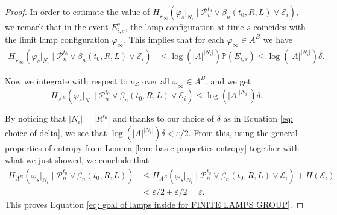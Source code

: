 \documentclass[reqno,oneside,11pt]{amsart}
\renewcommand{\P}{\mathbb{P}}
\theoremstyle{plain}
\theoremstyle{definition}
\begin{document}
\begin{proof}
In order to estimate the value of $H_{\varphi_{\infty}}\left( \varphi_{s}|_{N_i} \mid \mathcal{P}_n^{t_0}\vee\beta_n(t_0,R,L)\vee \mathcal{E}_i \right)$, we remark that in the event $E_{i,s}^c$, the lamp configuration at time $s$ coincides with the limit lamp configuration $\varphi_{\infty}$. This implies that for each $\varphi_{\infty}\in A^B$ we have
		\begin{align*}
				H_{\varphi_{\infty}}\left( \varphi_{s}|_{N_i} \mid \mathcal{P}_n^{t_0}\vee\beta_n(t_0,R,L)\vee \mathcal{E}_i \right)&\le \log\left(|A|^{|N_i|}\right)\P(E_{i,s}) \le \log\left(|A|^{|N_i|}\right)\delta.
		\end{align*}
		
	
	Now we integrate with respect to $\nu_{\mathcal{L}}$ over all $\varphi_{\infty}\in A^B$, and we get 
	\begin{equation*}
		H_{A^B}\left( \varphi_{s}|_{N_i} \mid \mathcal{P}_n^{t_0}\vee\beta_n(t_0,R,L)\vee \mathcal{E}_i \right)\le \log\left(|A|^{|N_i|}\right)\delta.
	\end{equation*}

	By noticing that $|N_i|=|R^{t_0}|$ and thanks to our choice of $\delta$ as in Equation \eqref{eq: choice of delta}, we see that $\log\left(|A|^{|N_i|}\right)\delta<\varepsilon/2$. From this, using the general properties of entropy from Lemma \ref{lem: basic properties entropy} together with what we just showed, we conclude that
	\begin{align*}
		H_{A^B}\left( \varphi_{s}|_{N_i} \mid \mathcal{P}_n^{t_0}\vee\beta_n(t_0,R,L) \right)&\le H_{A^B}\left( \varphi_{s}|_{N_i} \mid \mathcal{P}_n^{t_0}\vee\beta_n(t_0,R,L)\vee \mathcal{E}_i \right)+H(\mathcal{E}_i)\\
		&<\varepsilon/2 +\varepsilon/2=\varepsilon.
	\end{align*}
	This proves Equation \eqref{eq: goal of lamps inside for FINITE LAMPS GROUP}.
\end{proof}
\end{document}
